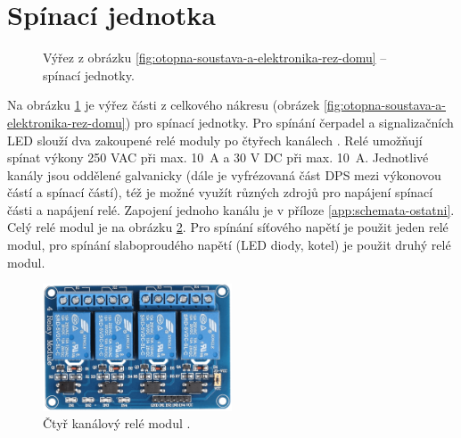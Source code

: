 \section{Spínací jednotka}
\begin{figure}[H]
   \centering
   \def\svgwidth{0.4\columnwidth}
   
    \caption[Umístění spínacích jednotek.]{Výřez z obrázku \ref{fig:otopna-soustava-a-elektronika-rez-domu} – spínací jednotky.}
    \label{fig:vyrez-spinaci-jednotka}
\end{figure}
Na obrázku \ref{fig:vyrez-spinaci-jednotka} je výřez části z celkového nákresu (obrázek \ref{fig:otopna-soustava-a-elektronika-rez-domu}) pro spínací jednotky. Pro spínání čerpadel a signalizačních LED slouží dva zakoupené relé moduly po čtyřech kanálech \cite{rele-modul-informace}. Relé umožňují spínat výkony 250 VAC při max. 10~A a 30 V DC při max. 10~A. Jednotlivé kanály jsou oddělené galvanicky (dále je vyfrézovaná část DPS mezi výkonovou částí a spínací částí), též je možné využít různých zdrojů pro napájení spínací části a napájení relé. Zapojení jednoho kanálu je v příloze \ref{app:schemata-ostatni}. Celý relé modul je na obrázku \ref{fig:ctyr-kanalovy-rele-modul}. Pro spínání síťového napětí je použit jeden relé modul, pro spínání slaboproudého napětí (LED diody, kotel) je použit druhý relé modul.



\begin{figure}[H]
    \centering
    \includegraphics[width=0.5\textwidth]{images/ctyr-kanalovy-rele-modul.png}
    \caption[Čtyř kanálový relé modul.]{Čtyř kanálový relé modul \cite{ctyr-kanalovy-rele-modul}.}
    \label{fig:ctyr-kanalovy-rele-modul}
\end{figure}